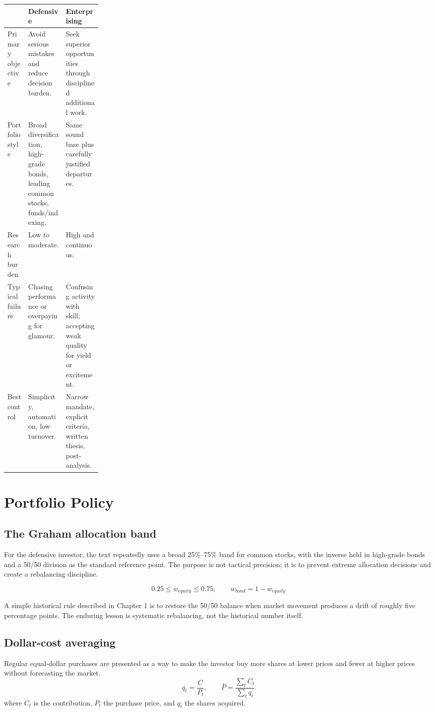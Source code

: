 \documentclass[11pt]{article}
\begin{document}
\begin{center}
\begin{tabularx}{\linewidth}{@{}p{0.22\linewidth}Y Y@{}}
\toprule
& \textbf{Defensive} & \textbf{Enterprising}\\
\midrule
Primary objective & Avoid serious mistakes and reduce decision burden. & Seek superior opportunities through disciplined additional work.\\
Portfolio style & Broad diversification, high-grade bonds, leading common stocks, funds/indexing. & Same sound base plus carefully justified departures.\\
Research burden & Low to moderate. & High and continuous.\\
Typical failure & Chasing performance or overpaying for glamour. & Confusing activity with skill; accepting weak quality for yield or excitement.\\
Best control & Simplicity, automation, low turnover. & Narrow mandate, explicit criteria, written thesis, post-analysis.\\
\bottomrule
\end{tabularx}
\end{center}

\section{Portfolio Policy}
\subsection{The Graham allocation band}
For the defensive investor, the text repeatedly uses a broad 25\%--75\% band for common stocks, with the inverse held in high-grade bonds and a 50/50 division as the standard reference point. The purpose is not tactical precision; it is to prevent extreme allocation decisions and create a rebalancing discipline.

\begin{equation}
0.25 \leq w_{equity} \leq 0.75, \qquad w_{bond}=1-w_{equity}
\end{equation}

A simple historical rule described in Chapter 1 is to restore the 50/50 balance when market movement produces a drift of roughly five percentage points. The enduring lesson is systematic rebalancing, not the historical number itself.

\subsection{Dollar-cost averaging}
Regular equal-dollar purchases are presented as a way to make the investor buy more shares at lower prices and fewer at higher prices without forecasting the market.
\begin{equation}
q_t=\frac{C}{P_t}, \qquad \bar{P}=\frac{\sum_t C_t}{\sum_t q_t}
\end{equation}
where $C_t$ is the contribution, $P_t$ the purchase price, and $q_t$ the shares acquired.
\end{document}
